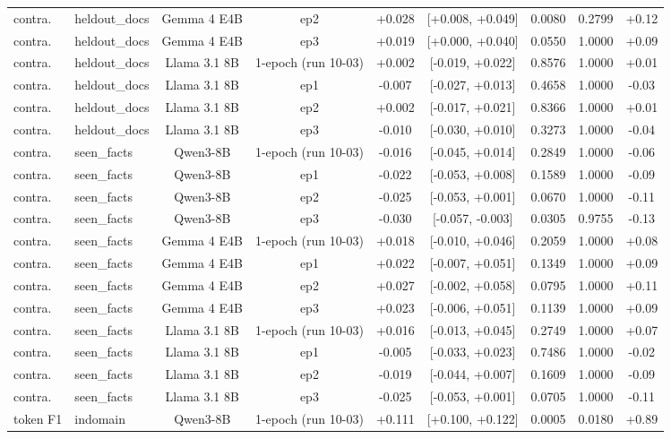 \begin{table}[t]
{\begin{tabular}{llccccccc}
contra. & heldout\_docs & Gemma 4 E4B & ep2 & +0.028 & [+0.008, +0.049] & 0.0080 & 0.2799 & +0.12 \\
contra. & heldout\_docs & Gemma 4 E4B & ep3 & +0.019 & [+0.000, +0.040] & 0.0550 & 1.0000 & +0.09 \\
contra. & heldout\_docs & Llama 3.1 8B & 1-epoch (run 10-03) & +0.002 & [-0.019, +0.022] & 0.8576 & 1.0000 & +0.01 \\
contra. & heldout\_docs & Llama 3.1 8B & ep1 & -0.007 & [-0.027, +0.013] & 0.4658 & 1.0000 & -0.03 \\
contra. & heldout\_docs & Llama 3.1 8B & ep2 & +0.002 & [-0.017, +0.021] & 0.8366 & 1.0000 & +0.01 \\
contra. & heldout\_docs & Llama 3.1 8B & ep3 & -0.010 & [-0.030, +0.010] & 0.3273 & 1.0000 & -0.04 \\
contra. & seen\_facts & Qwen3-8B & 1-epoch (run 10-03) & -0.016 & [-0.045, +0.014] & 0.2849 & 1.0000 & -0.06 \\
contra. & seen\_facts & Qwen3-8B & ep1 & -0.022 & [-0.053, +0.008] & 0.1589 & 1.0000 & -0.09 \\
contra. & seen\_facts & Qwen3-8B & ep2 & -0.025 & [-0.053, +0.001] & 0.0670 & 1.0000 & -0.11 \\
contra. & seen\_facts & Qwen3-8B & ep3 & -0.030 & [-0.057, -0.003] & 0.0305 & 0.9755 & -0.13 \\
contra. & seen\_facts & Gemma 4 E4B & 1-epoch (run 10-03) & +0.018 & [-0.010, +0.046] & 0.2059 & 1.0000 & +0.08 \\
contra. & seen\_facts & Gemma 4 E4B & ep1 & +0.022 & [-0.007, +0.051] & 0.1349 & 1.0000 & +0.09 \\
contra. & seen\_facts & Gemma 4 E4B & ep2 & +0.027 & [-0.002, +0.058] & 0.0795 & 1.0000 & +0.11 \\
contra. & seen\_facts & Gemma 4 E4B & ep3 & +0.023 & [-0.006, +0.051] & 0.1139 & 1.0000 & +0.09 \\
contra. & seen\_facts & Llama 3.1 8B & 1-epoch (run 10-03) & +0.016 & [-0.013, +0.045] & 0.2749 & 1.0000 & +0.07 \\
contra. & seen\_facts & Llama 3.1 8B & ep1 & -0.005 & [-0.033, +0.023] & 0.7486 & 1.0000 & -0.02 \\
contra. & seen\_facts & Llama 3.1 8B & ep2 & -0.019 & [-0.044, +0.007] & 0.1609 & 1.0000 & -0.09 \\
contra. & seen\_facts & Llama 3.1 8B & ep3 & -0.025 & [-0.053, +0.001] & 0.0705 & 1.0000 & -0.11 \\
token F1 & indomain & Qwen3-8B & 1-epoch (run 10-03) & +0.111 & [+0.100, +0.122] & 0.0005 & 0.0180 & +0.89 \\

\end{tabular}}
\end{table}
